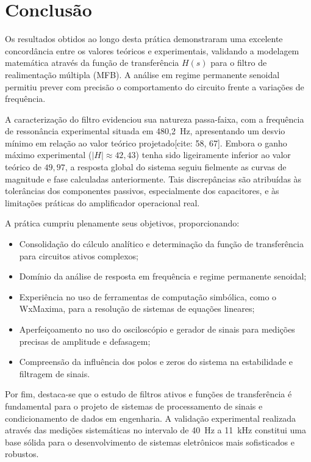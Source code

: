 \chapter{Conclusão}

Os resultados obtidos ao longo desta prática demonstraram uma excelente concordância entre os valores teóricos e experimentais, validando a modelagem matemática através da função de transferência $H(s)$ para o filtro de realimentação múltipla (MFB). A análise em regime permanente senoidal permitiu prever com precisão o comportamento do circuito frente a variações de frequência.

A caracterização do filtro evidenciou sua natureza passa-faixa, com a frequência de ressonância experimental situada em 480,2~Hz, apresentando um desvio mínimo em relação ao valor teórico projetado[cite: 58, 67]. Embora o ganho máximo experimental ($|H| \approx 42,43$) tenha sido ligeiramente inferior ao valor teórico de $49,97$, a resposta global do sistema seguiu fielmente as curvas de magnitude e fase calculadas anteriormente. Tais discrepâncias são atribuídas às tolerâncias dos componentes passivos, especialmente dos capacitores, e às limitações práticas do amplificador operacional real.

A prática cumpriu plenamente seus objetivos, proporcionando:
\begin{itemize}
	\item Consolidação do cálculo analítico e determinação da função de transferência para circuitos ativos complexos;
	\item Domínio da análise de resposta em frequência e regime permanente senoidal;
	\item Experiência no uso de ferramentas de computação simbólica, como o WxMaxima, para a resolução de sistemas de equações lineares;
	\item Aperfeiçoamento no uso do osciloscópio e gerador de sinais para medições precisas de amplitude e defasagem;
	\item Compreensão da influência dos polos e zeros do sistema na estabilidade e filtragem de sinais.
\end{itemize}

Por fim, destaca-se que o estudo de filtros ativos e funções de transferência é fundamental para o projeto de sistemas de processamento de sinais e condicionamento de dados em engenharia. A validação experimental realizada através das medições sistemáticas no intervalo de 40~Hz a 11~kHz constitui uma base sólida para o desenvolvimento de sistemas eletrônicos mais sofisticados e robustos.